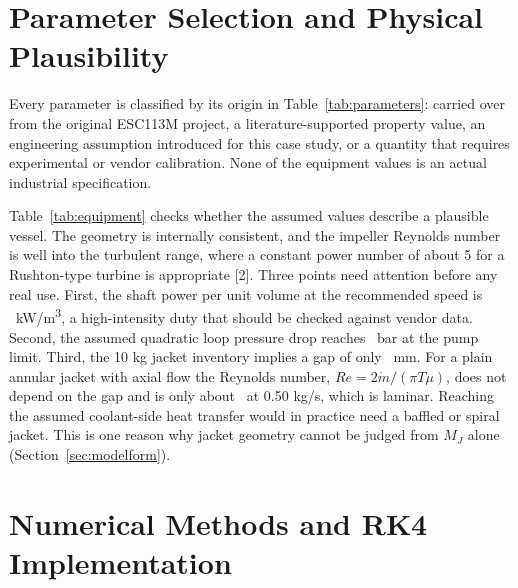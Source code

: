 \documentclass[11pt,letterpaper]{article}
\newcommand{\mdot}{\dot m}
\begin{document}
\section{Parameter Selection and Physical Plausibility}

Every parameter is classified by its origin in Table~\ref{tab:parameters}: carried over from the original ESC113M project, a literature-supported property value, an engineering assumption introduced for this case study, or a quantity that requires experimental or vendor calibration. None of the equipment values is an actual industrial specification.

\begin{table}[H]
\centering
\caption{Model parameters and their classification.}\label{tab:parameters}
{\small}
\end{table}

Table~\ref{tab:equipment} checks whether the assumed values describe a plausible vessel. The geometry is internally consistent, and the impeller Reynolds number is well into the turbulent range, where a constant power number of about 5 for a Rushton-type turbine is appropriate [2]. Three points need attention before any real use. First, the shaft power per unit volume at the recommended speed is \vPV\ kW/m\textsuperscript{3}, a high-intensity duty that should be checked against vendor data. Second, the assumed quadratic loop pressure drop reaches \vDPMax\ bar at the pump limit. Third, the 10 kg jacket inventory implies a gap of only \vGap\ mm. For a plain annular jacket with axial flow the Reynolds number, \(Re = 2\mdot/(\pi T\mu)\), does not depend on the gap and is only about \vReJacket\ at 0.50 kg/s, which is laminar. Reaching the assumed coolant-side heat transfer would in practice need a baffled or spiral jacket. This is one reason why jacket geometry cannot be judged from \(M_J\) alone (Section~\ref{sec:modelform}).

\begin{table}[H]
\centering
\caption{Equipment and process checks (indicative; water-like properties).}\label{tab:equipment}
{\small}
\end{table}

\section{Numerical Methods and RK4 Implementation}
\end{document}
